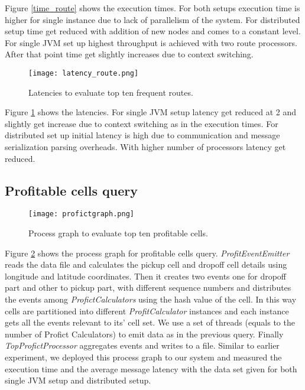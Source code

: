 Figure \ref{time_route} shows the execution times. For both setups execution time is higher for single instance due to lack of parallelism of the system. For distributed setup time get reduced with addition of new nodes and comes to a constant level. For single JVM set up highest throughput is achieved with two route processors. After that point time get slightly increases due to context switching.

\begin{figure}[!t]
        \centering
        \texttt{[image: latency\_route.png]}
        \caption{Latencies to evaluate top ten frequent routes.}
        \label{latency_route}
\end{figure}


Figure \ref{latency_route} shows the latencies. For single JVM setup latency get reduced at 2 and slightly get increase due to context switching as in the execution times. For distributed set up initial latency is high due to communication and message serialization parsing overheads. With higher number of processors latency get reduced.

\subsection{Profitable cells query}

\begin{figure}[!t]
        \centering
        \texttt{[image: profictgraph.png]}
        \caption{Process graph to evaluate top ten profitable cells.}
        \label{profictgraph}
\end{figure}

Figure \ref{profictgraph} shows the process graph for profitable cells query. \textit{ProfitEventEmitter} reads the data file and calculates the pickup cell and dropoff cell details using longitude and latitude coordinates. Then it creates two events one for dropoff part and other to pickup part, with different sequence numbers and distributes the events among \textit{ProfictCalculators} using the hash value of the cell. In this way cells are partitioned into different \textit{ProfitCalculator} instances and each instance gets all the events relevant to its' cell set. We use a set of threads (equals to the number of Profict Calculators) to emit data as in the previous query. Finally \textit{TopProfictProcessor} aggregates events and writes to a file. 
Similar to earlier experiment,  we deployed this process graph to our system and measured the execution time and the average message latency with the data set given for both single JVM setup and distributed setup.


